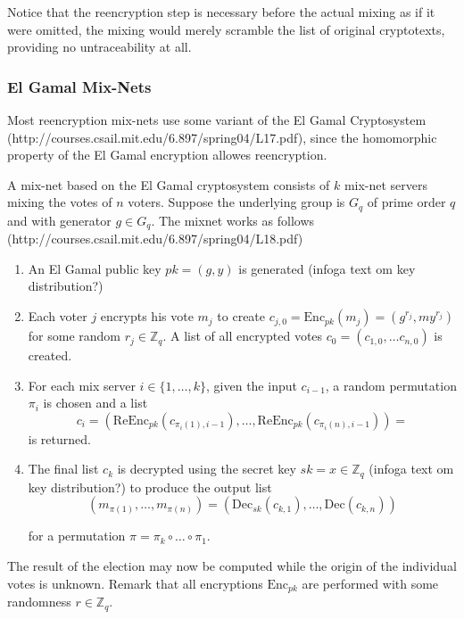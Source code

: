 Notice that the reencryption step is necessary before the actual
mixing as if it were omitted, the mixing would merely scramble the
list of original cryptotexts, providing no untraceability at all.

\subsubsection{El Gamal Mix-Nets}

Most reencryption mix-nets use some variant of the El Gamal
Cryptosystem (http://courses.csail.mit.edu/6.897/spring04/L17.pdf),
since the homomorphic property of the El Gamal encryption allowes
reencryption.

A mix-net based on the El Gamal cryptosystem consists of $k$ mix-net
servers mixing the votes of $n$ voters. Suppose the underlying group
is $G_q$ of prime order $q$ and with generator $g \in G_q$. The mixnet
works as follows \\
(http://courses.csail.mit.edu/6.897/spring04/L18.pdf)

\begin{enumerate}
\item An El Gamal public key $pk = (g,y)$ is generated (infoga text om key distribution?)
\item Each voter $j$ encrypts his vote $m_j$ to create $c_{j,0} =
  \mathrm{Enc}_{pk}(m_j) = (g^{r_j},my^{r_j})$ for some random $r_j
  \in \mathbb{Z}_q$.  A list of all encrypted votes $c_0 = \left(
  c_{1,0}, \hdots c_{n,0}\right)$ is created.
\item For each mix server $i \in \{1,\hdots, k\}$, given the input
  $c_{i-1}$, a random permutation $\pi _i$ is chosen and a list 
  $$ 
  c_i =\left(\mathrm{ReEnc}_{pk}(c_{\pi_i(1),i-1}), \hdots,
  \mathrm{ReEnc}_{pk}(c_{\pi_i(n), i-1})\right) =
  $$
  is returned.
\item The final list $c_k$ is decrypted using the secret key $sk = x
  \in \mathbb{Z}_q$ (infoga text om key distribution?) to produce
  the output list
 $$ 
  (m_{\pi (1)}, \hdots , m_{\pi (n)}) =
  \left(\mathrm{Dec}_{sk}(c_{k,1}), \hdots, \mathrm{Dec}(c_{k,n})\right)
  $$
  
  for a permutation $\pi = \pi_k \circ \hdots \circ \pi_1$.
\end{enumerate}

The result of the election may now be computed while the origin of the
individual votes is unknown. Remark that all encryptions
$\mathrm{Enc}_{pk}$ are performed with some randomness $r \in
\mathbb{Z}_q$.

